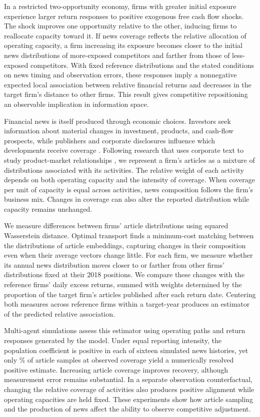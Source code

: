 In a restricted two-opportunity economy, firms with greater initial exposure
experience larger return responses to positive exogenous free cash flow shocks.
The shock improves one opportunity relative to the other, inducing firms to
reallocate capacity toward it.
If news coverage reflects the relative allocation of operating capacity, a
firm increasing its exposure becomes closer to the initial news distributions
of more-exposed competitors and farther from those of less-exposed competitors.
With fixed reference distributions and the stated conditions on news timing
and observation errors, these responses imply a nonnegative expected local
association between relative financial returns and decreases in the target
firm's distance to other firms.
This result gives competitive repositioning an observable implication in
information space.

Financial news is itself produced through economic choices.
Investors seek information about material changes in investment, products,
and cash-flow prospects, while publishers and corporate disclosures influence
which developments receive coverage \citep{gentzkow_media_bias_2006}.
Following research that uses corporate text to study product-market
relationships \citep{hoberg_phillips_2016}, we represent a firm's articles as
a mixture of distributions associated with its activities.
The relative weight of each activity depends on both operating capacity and
the intensity of coverage.
When coverage per unit of capacity is equal across activities, news
composition follows the firm's business mix.
Changes in coverage can also alter the reported distribution while capacity
remains unchanged.

We measure differences between firms' article distributions using squared
Wasserstein distance.
Optimal transport finds a minimum-cost matching between the distributions of
article embeddings, capturing changes in their composition even when their
average vectors change little.
For each firm, we measure whether its annual news distribution moves closer
to or farther from other firms' distributions fixed at their 2018 positions.
We compare these changes with the reference firms' daily excess returns,
summed with weights determined by the proportion of the target firm's
articles published after each return date.
Centering both measures across reference firms within a target-year produces
an estimator of the predicted relative association.

Multi-agent simulations assess this estimator using operating paths and
return responses generated by the model.
Under equal reporting intensity, the population coefficient is positive in
each of sixteen simulated news histories, yet only
\% of article samples at
observed coverage yield a numerically resolved positive estimate.
Increasing article coverage improves recovery, although measurement error
remains substantial.
In a separate observation counterfactual, changing the relative coverage of
activities also produces positive alignment while operating capacities are held fixed.
These experiments show how article sampling and the production of news affect
the ability to observe competitive adjustment.

